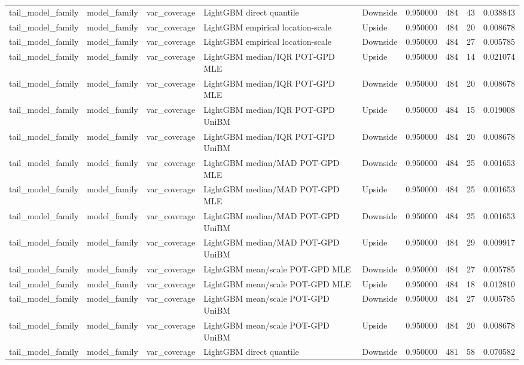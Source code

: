 \begin{tabular}{lllllrrr}
tail\_model\_family & model\_family & var\_coverage & LightGBM direct quantile & Downside & 0.950000 & 484 & 43 & 0.038843 \\
tail\_model\_family & model\_family & var\_coverage & LightGBM empirical location-scale & Upside & 0.950000 & 484 & 20 & 0.008678 \\
tail\_model\_family & model\_family & var\_coverage & LightGBM empirical location-scale & Downside & 0.950000 & 484 & 27 & 0.005785 \\
tail\_model\_family & model\_family & var\_coverage & LightGBM median/IQR POT-GPD MLE & Upside & 0.950000 & 484 & 14 & 0.021074 \\
tail\_model\_family & model\_family & var\_coverage & LightGBM median/IQR POT-GPD MLE & Downside & 0.950000 & 484 & 20 & 0.008678 \\
tail\_model\_family & model\_family & var\_coverage & LightGBM median/IQR POT-GPD UniBM & Upside & 0.950000 & 484 & 15 & 0.019008 \\
tail\_model\_family & model\_family & var\_coverage & LightGBM median/IQR POT-GPD UniBM & Downside & 0.950000 & 484 & 20 & 0.008678 \\
tail\_model\_family & model\_family & var\_coverage & LightGBM median/MAD POT-GPD MLE & Downside & 0.950000 & 484 & 25 & 0.001653 \\
tail\_model\_family & model\_family & var\_coverage & LightGBM median/MAD POT-GPD MLE & Upside & 0.950000 & 484 & 25 & 0.001653 \\
tail\_model\_family & model\_family & var\_coverage & LightGBM median/MAD POT-GPD UniBM & Downside & 0.950000 & 484 & 25 & 0.001653 \\
tail\_model\_family & model\_family & var\_coverage & LightGBM median/MAD POT-GPD UniBM & Upside & 0.950000 & 484 & 29 & 0.009917 \\
tail\_model\_family & model\_family & var\_coverage & LightGBM mean/scale POT-GPD MLE & Downside & 0.950000 & 484 & 27 & 0.005785 \\
tail\_model\_family & model\_family & var\_coverage & LightGBM mean/scale POT-GPD MLE & Upside & 0.950000 & 484 & 18 & 0.012810 \\
tail\_model\_family & model\_family & var\_coverage & LightGBM mean/scale POT-GPD UniBM & Downside & 0.950000 & 484 & 27 & 0.005785 \\
tail\_model\_family & model\_family & var\_coverage & LightGBM mean/scale POT-GPD UniBM & Upside & 0.950000 & 484 & 20 & 0.008678 \\
tail\_model\_family & model\_family & var\_coverage & LightGBM direct quantile & Downside & 0.950000 & 481 & 58 & 0.070582 \\

\end{tabular}
